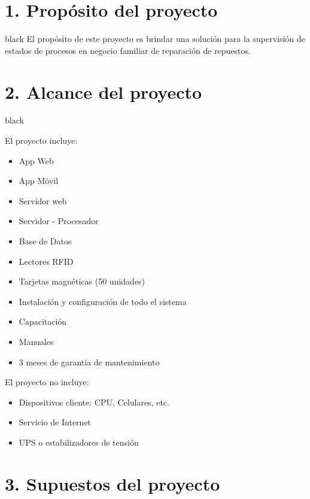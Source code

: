 \documentclass[11pt]{charter}
\begin{document}
\section{1. Propósito del proyecto}
\label{sec:proposito}

\begin{consigna}{black}
El propósito de este proyecto es brindar una solución para la supervisión de estados de procesos en negocio familiar de reparación de repuestos. 

\end{consigna}

\section{2. Alcance del proyecto}
\label{sec:alcance}

\begin{consigna}{black}

El proyecto incluye:
\begin{itemize}
\item App Web
\item App Móvil
\item Servidor web
\item Servidor - Procesador
\item Base de Datos
\item Lectores RFID
\item Tarjetas magnéticas (50 unidades)
\item Instalación y configuración de todo el sistema
\item Capacitación
\item Manuales
\item 3 meses de garantía de mantenimiento
\end{itemize}

El proyecto no incluye:
\begin{itemize}
\item Dispositivos cliente: CPU, Celulares, etc.
\item Servicio de Internet
\item UPS o estabilizadores de tensión
\end{itemize}

\end{consigna}


\section{3. Supuestos del proyecto}
\label{sec:supuestos}
\end{document}
